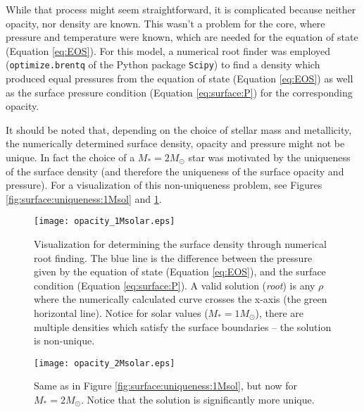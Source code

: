 While that process might seem straightforward, it is complicated because neither opacity, nor density are known.  This wasn't a problem for the core, where pressure and temperature were known, which are needed for the equation of state (Equation \ref{eq:EOS}).  For this model, a numerical root finder was employed (\texttt{optimize.brentq} of the Python package \texttt{Scipy}) to find a density which produced equal pressures from the equation of state (Equation \ref{eq:EOS}) as well as the surface pressure condition (Equation \ref{eq:surface:P}) for the corresponding opacity.

It should be noted that, depending on the choice of stellar mass and metallicity, the numerically determined surface density, opacity and pressure might not be unique.  In fact the choice of a $M_\ast = 2 M_\odot$ star was motivated by the uniqueness of the surface density (and therefore the uniqueness of the surface opacity and pressure).  For a visualization of this non-uniqueness problem, see Figures \ref{fig:surface:uniqueness:1Msol} and \ref{fig:surface:uniqueness:2Msol}.

\begin{figure}[t]
\centering
    \texttt{[image: opacity\_1Msolar.eps]}
        \caption{\label{fig:surface:uniqueness:1Msol} Visualization for determining the surface density through numerical root finding.  The blue line is the difference between the pressure given by the equation of state (Equation \ref{eq:EOS}), and the surface condition (Equation \ref{eq:surface:P}).  A valid solution (\emph{root}) is any $\rho$ where the numerically calculated curve crosses the x-axis (the green horizontal line).  Notice for solar values  ($M_\ast = 1 M_\odot$), there are multiple densities which satisfy the surface boundaries -- the solution is non-unique.}
    \texttt{[image: opacity\_2Msolar.eps]}
        \caption{\label{fig:surface:uniqueness:2Msol} Same as in Figure \ref{fig:surface:uniqueness:1Msol}, but now for $M_\ast = 2 M_\odot$. Notice that the solution is significantly more unique. }

\end{figure}

